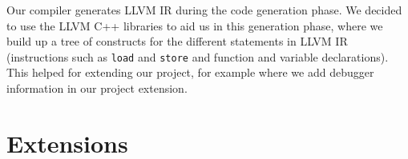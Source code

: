 \documentclass[a4wide, 11pt]{article}
\begin{document}
Our compiler generates LLVM IR during the code generation phase. We decided to use the LLVM C++ libraries to aid us in this generation phase, where we build up a tree of constructs for the different statements in LLVM IR (instructions such as \texttt{load} and \texttt{store} and function and variable declarations). This helped for extending our project, for example where we add debugger information in our project extension.

\section{Extensions}
\end{document}
